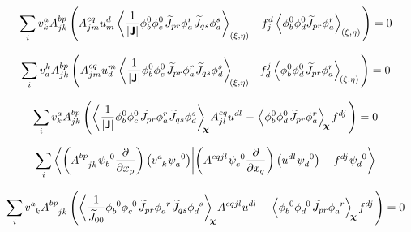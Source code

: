 \begin{equation}
   \sum_i v^a_k A^{bp}_{jk} \left(A^{cq}_{jm} u^d_m \left\langle \frac{1}{|\bm{\mathsf{J}}|} \phi^0_b \phi^0_c \mkern2mu \widetilde{J}_{pr}  \phi^r_a \mkern1mu \widetilde{J}_{qs}  \phi^s_d \right\rangle_{(\xi, \eta)} \mkern-4mu - \mkern1mu f^d_j \left\langle\phi^0_b \phi^0_d \widetilde{J}_{pr}  \phi^r_a \right\rangle_{(\xi, \eta)} \mkern2mu \right) = 0
\end{equation}

\begin{equation}
   \sum_i v^k_a A^{bp}_{jk} \left(A^{cq}_{jm} u^m_d \left\langle \frac{1}{|\bm{\mathsf{J}}|} \phi^0_b \phi^0_c \mkern2mu \widetilde{J}_{pr}  \phi^r_a \mkern1mu \widetilde{J}_{qs}  \phi^s_d \right\rangle_{\mkern-4mu(\xi, \eta)} \mkern-6mu - \mkern1mu f^j_d \left\langle\phi^0_b \phi^0_d \mkern2mu \widetilde{J}_{pr}  \phi^r_a \right\rangle_{\mkern-2mu(\xi, \eta)} \mkern2mu \right) = 0
\end{equation}

\begin{equation}
   \sum_i v^a_k A^{bp}_{jk} \left( \left\langle \frac{1}{|\bm{\mathsf{J}}|} \phi^0_b \phi^0_c \mkern2mu \widetilde{J}_{pr}  \phi^r_a \mkern1mu \widetilde{J}_{qs}  \phi^s_d \right\rangle_{\mkern-5mu\bm{\chi}} \mkern-2mu A^{cq}_{jl} u^{dl} \mkern1mu - \mkern1mu \left\langle\phi^0_b \phi^0_d \mkern2mu \widetilde{J}_{pr}  \phi^r_a \right\rangle_{\mkern-3mu\bm{\chi}} \mkern-1mu f^{dj} \mkern2mu \right) = 0
\end{equation}

\begin{equation}
   \sum_i \bra{\left(A^{bp}_{\phantom{bp}jk} \mkern1mu \psi^{\phantom{b}0}_b \frac{\partial}{\partial x_p}\right) \left(v^a_{\phantom{a}k} \mkern1mu \psi^{\phantom{a}0}_a\right)}\ket{\left(A^{cqjl} \mkern1mu \psi^{\phantom{c}0}_c \frac{\partial}{\partial x_q}\right) \left(u^{dl} \mkern1mu \psi^{\phantom{d}0}_d\right) - f^{dj} \mkern1mu \psi^{\phantom{d}0}_d}
\end{equation}

\begin{equation}
   \sum_i v^a_{\phantom{a}k} A^{bp}_{\phantom{bp}jk} \left( \left\langle \frac{1}{\widetilde{J}_{00}} \phi^{\phantom{b}0}_b \phi^{\phantom{c}0}_c \mkern2mu \widetilde{J}_{pr}  \phi^{\phantom{a}r}_a \mkern1mu \widetilde{J}_{qs}  \phi^{\phantom{d}s}_d \right\rangle_{\mkern-5mu\bm{\chi}} \mkern-2mu A^{cqjl} u^{dl} \mkern1mu - \mkern1mu \left\langle\phi^{\phantom{b}0}_b \phi^{\phantom{d}0}_d \mkern2mu \widetilde{J}_{pr}  \phi^{\phantom{a}r}_a \right\rangle_{\mkern-3mu\bm{\chi}} \mkern-1mu f^{dj} \mkern2mu \right) = 0
\end{equation}

